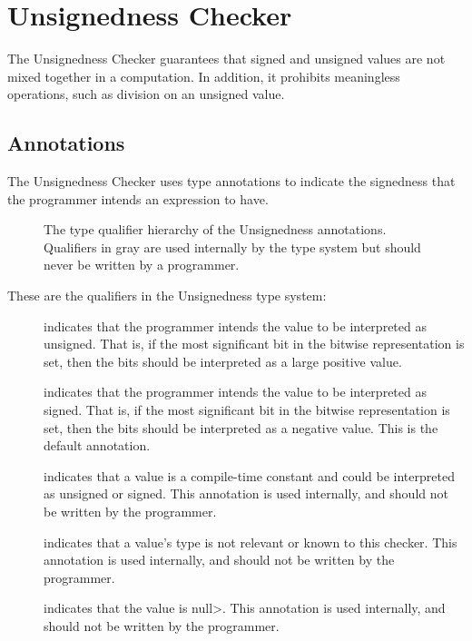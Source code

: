 \htmlhr
\chapter{Unsignedness Checker\label{unsignedness-checker}}

The Unsignedness Checker guarantees that signed and unsigned values are not mixed
together in a computation. In addition, it prohibits meaningless operations, such
as division on an unsigned value.


\section{Annotations\label{unsignedness-checker-annotations}}

The Unsignedness Checker uses type annotations to indicate the signedness that the programmer intends an expression to have.

\begin{figure}
\caption{The type qualifier hierarchy of the Unsignedness annotations.
Qualifiers in gray are used internally by the type system but should never be written by a programmer.}
\label{fig-unsignedness-hierarchy}
\end{figure}

These are the qualifiers in the Unsignedness type system:

\begin{description}

\item[]
    indicates that the programmer intends the value to be
    interpreted as unsigned.
    That is, if the most significant bit in the bitwise representation is
    set, then the bits should be interpreted as a large positive value.

\item[]
    indicates that the programmer intends the value to be
    interpreted as signed.
    That is, if the most significant bit in the bitwise representation is
    set, then the bits should be interpreted as a negative value.
    This is the default annotation.

\item[]
    indicates that a value is a compile-time constant and could be
    interpreted as unsigned or signed.
    This annotation is used internally, and should not
    be written by the programmer.

\item[]
    indicates that a value's type is not relevant or known to this checker.
    This annotation is used internally, and should not be
    written by the programmer.

\item[]
  indicates that the value is \<null>.
    This annotation is used internally, and should not
    be written by the programmer.

\end{description}

